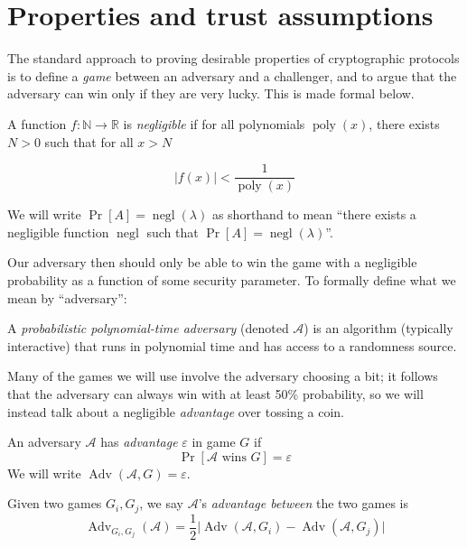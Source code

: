 \documentclass[12pt,a4paper]{article}
\DeclareMathOperator{\poly}{\text{poly}}
\DeclareMathOperator{\negl}{\text{negl}}
\DeclareMathOperator{\Adv}{\text{Adv}}
\theoremstyle{definition}
\newcounter{protocol}
\begin{document}
\section{Properties and trust assumptions}\label{sec-properties}
The standard approach to proving desirable properties of cryptographic protocols is to define a \textit{game} between an adversary and a challenger, and to argue that the adversary can win only if they are very lucky. This is made formal below.
\begin{definition}
    A function $f:\mathbb{N}\rightarrow\mathbb{R}$ is \textit{negligible} if for all polynomials $\poly(x)$, there exists $N>0$ such that for all $x>N$

    $$|f(x)|<\frac{1}{\poly(x)}$$

    We will write $\Pr[A]=\negl(\lambda)$ as shorthand to mean ``there exists a negligible function $\negl$ such that $\Pr[A]=\negl(\lambda)$''.
\end{definition}
Our adversary then should only be able to win the game with a negligible probability as a function of some security parameter. To formally define what we mean by ``adversary'':
\begin{definition}
    A \textit{probabilistic polynomial-time adversary} (denoted $\mathcal{A}$) is an algorithm (typically interactive) that runs in polynomial time and has access to a randomness source.
\end{definition}
Many of the games we will use involve the adversary choosing a bit; it follows that the adversary can always win with at least 50\% probability, so we will instead talk about a negligible \textit{advantage} over tossing a coin. 
\begin{definition}[Advantage]
    An adversary $\mathcal{A}$ has \textit{advantage} $\varepsilon$ in game $G$ if
    $$\Pr\left[\mathcal{A}\text{ wins }G\right]=\varepsilon$$
    We will write $\Adv(\mathcal{A}, G)=\varepsilon$.

    Given two games $G_i, G_j$, we say $\mathcal{A}$'s \textit{advantage between} the two games is
    $$\Adv_{G_i, G_j}(\mathcal{A}) = \frac{1}{2}
    \Big|
        \Adv(\mathcal{A}, G_i)
         -
        \Adv(\mathcal{A}, G_j)
    \Big|$$
\end{definition}
\end{document}
